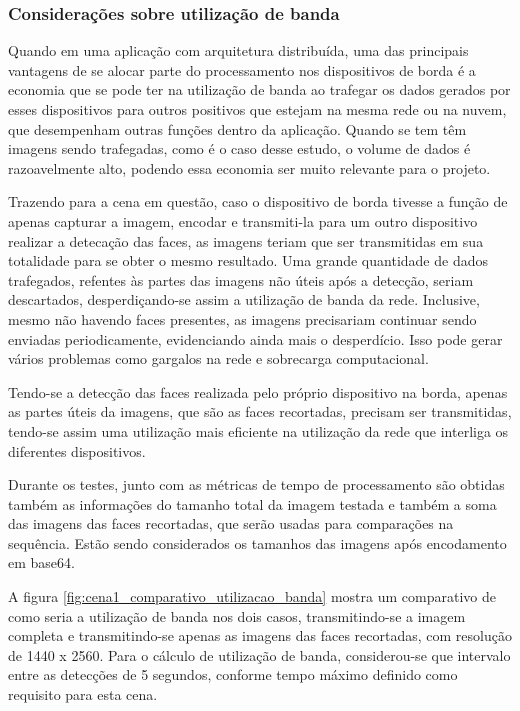 \subsubsection{Considerações sobre utilização de banda}

Quando em uma aplicação com arquitetura distribuída, uma das principais vantagens de se alocar parte do processamento nos dispositivos de borda é a economia que se pode ter na utilização de banda ao trafegar os dados gerados por esses dispositivos para outros positivos que estejam na mesma rede ou na nuvem, que desempenham outras funções dentro da aplicação. Quando se tem têm imagens sendo trafegadas, como é o caso desse estudo, o volume de dados é razoavelmente alto, podendo essa economia ser muito relevante para o projeto.

Trazendo para a cena em questão, caso o dispositivo de borda tivesse a função de apenas capturar a imagem, encodar e transmiti-la para um outro dispositivo realizar a detecação das faces, as imagens teriam que ser transmitidas em sua totalidade para se obter o mesmo resultado. Uma grande quantidade de dados trafegados, refentes às partes das imagens não úteis após a detecção, seriam descartados, desperdiçando-se assim a utilização de banda da rede. Inclusive, mesmo não havendo faces presentes, as imagens precisariam continuar sendo enviadas periodicamente, evidenciando ainda mais o desperdício. Isso pode gerar vários problemas como gargalos na rede e sobrecarga computacional.

Tendo-se a detecção das faces realizada pelo próprio dispositivo na borda, apenas as partes úteis da imagens, que são as faces recortadas, precisam ser transmitidas, tendo-se assim uma utilização mais eficiente na utilização da rede que interliga os diferentes dispositivos.

Durante os testes, junto com as métricas de tempo de processamento são obtidas também as informações do tamanho total da imagem testada e também a soma das imagens das faces recortadas, que serão usadas para comparações na sequência. Estão sendo considerados os tamanhos das imagens após encodamento em base64.

A figura \ref{fig:cena1_comparativo_utilizacao_banda} mostra um comparativo de como seria a utilização de banda nos dois casos, transmitindo-se a imagem completa e transmitindo-se apenas as imagens das faces recortadas, com resolução de 1440 x 2560. Para o cálculo de utilização de banda, considerou-se que intervalo entre as detecções de 5 segundos, conforme tempo máximo definido como requisito para esta cena.

